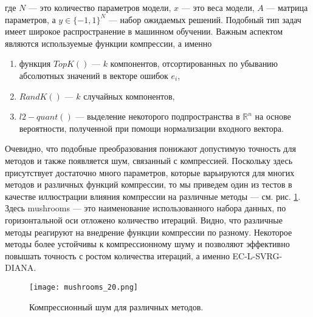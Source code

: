   где $N$ --- это количество параметров модели, $x$ --- это веса модели, $A$ --- матрица параметров, а $y \in {\{-1,1\}}^N$ --- набор ожидаемых решений. Подобный тип задач имеет широкое распространение в машинном обучении. Важным аспектом являются используемые функции компрессии, а именно 
  \begin{enumerate}
    \item функция $TopK()$ --- $k$ компонентов, отсортированных по убыванию абсолютных значений в векторе ошибок $e_i$,
    \item $RandK()$ --- $k$ случайных компонентов,
    \item $l2-quant()$ --- выделение некоторого подпространства в $\mathbb{R}^n$ на основе вероятности, полученной при помощи нормализации входного вектора. 
  \end{enumerate}

  Очевидно, что подобные преобразования понижают допустимую точность для методов и также появляется шум, связанный с компрессией. Поскольку здесь присутствует достаточно много параметров, которые варьируются для многих методов и различных функций компрессии, то мы приведем один из тестов в качестве иллюстрации влияния компрессии на различные методы --- см. рис. \ref{compr}. Здесь mushrooms --- это наименование использованного набора данных, по горизонтальной оси отложено количество итераций. Видно, что различные методы реагируют на внедрение функции компрессии по разному. Некоторое методы более устойчивы к компрессионному шуму и позволяют эффективно повышать точность с ростом количества итераций, а именно EC-L-SVRG-DIANA.
  \begin{figure}
    \begin{center}
      \texttt{[image: mushrooms\_20.png]}
    \end{center}
    \caption{Компрессионный шум для различных методов.}
    \label{compr}
  \end{figure}

